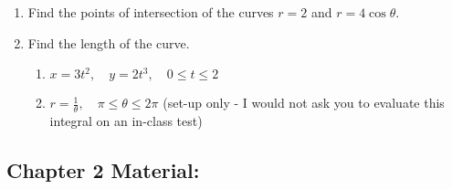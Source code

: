 \begin{enumerate}
%

\item Find the points of intersection of the curves \(r=2\) and \(r = 4\cos \theta\). \label{prob7}%

\item Find the length of the curve.\label{prob8}
\begin{enumerate}
\item \(x = 3t^2, \quad y=2t^3, \quad 0\leq t \leq 2\) \label{prob8a}%
\item \(r = \frac{1}{\theta}, \quad \pi \leq \theta \leq 2\pi\) (set-up only - I would not ask you to evaluate this integral on an in-class test) \label{prob8b}%
\end{enumerate}
\end{enumerate}

\subsection*{Chapter 2 Material:}


